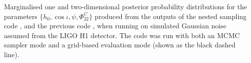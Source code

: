 \label{fig:simnoise_single}
Marginalised one and two-dimensional posterior probability distributions
for the parameters $\{h_0, \cos{\iota}, \psi, \Phi_{22}^C\}$
produced from the outputs of the nested sampling code \lppen, and the previous
code \lppe, when running on simulated Gaussian noise assumed from the LIGO H1 detector. The \lppe code was run with both an MCMC sampler mode and a grid-based
evaluation mode (shown as the black dashed line).
